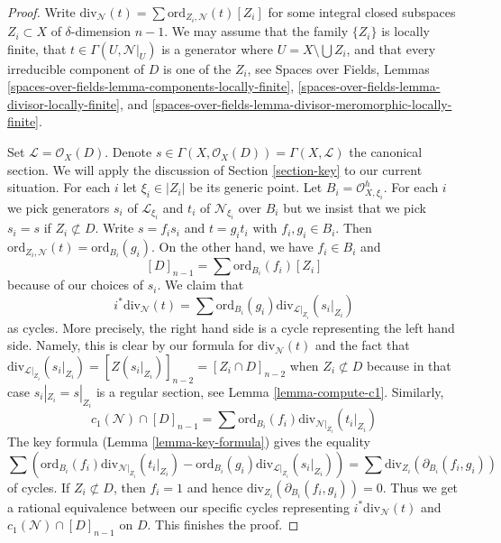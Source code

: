 \documentclass{stacks-project}
\theoremstyle{plain}
\theoremstyle{definition}
\theoremstyle{remark}
\numberwithin{equation}{subsection}
\begin{document}
\begin{proof}
Write $\text{div}_\mathcal{N}(t) = \sum \text{ord}_{Z_i, \mathcal{N}}(t)[Z_i]$
for some integral closed subspaces $Z_i \subset X$ of $\delta$-dimension
$n - 1$. We may assume that the family $\{Z_i\}$ is locally
finite, that $t \in \Gamma(U, \mathcal{N}|_U)$ is a generator
where $U = X \setminus \bigcup Z_i$, and that every irreducible component
of $D$ is one of the $Z_i$, see
Spaces over Fields, Lemmas
\ref{spaces-over-fields-lemma-components-locally-finite},
\ref{spaces-over-fields-lemma-divisor-locally-finite}, and
\ref{spaces-over-fields-lemma-divisor-meromorphic-locally-finite}.

\medskip\noindent
Set $\mathcal{L} = \mathcal{O}_X(D)$. Denote
$s \in \Gamma(X, \mathcal{O}_X(D)) = \Gamma(X, \mathcal{L})$
the canonical section. We will apply the discussion of
Section \ref{section-key} to our current situation.
For each $i$ let $\xi_i \in |Z_i|$ be its generic point. Let
$B_i = \mathcal{O}_{X, \xi_i}^h$. For each $i$ we pick generators
$s_i$ of $\mathcal{L}_{\xi_i}$ and $t_i$ of $\mathcal{N}_{\xi_i}$
over $B_i$ but we insist that we pick $s_i = s$ if $Z_i \not \subset D$.
Write $s = f_i s_i$ and $t = g_i t_i$ with $f_i, g_i \in B_i$.
Then $\text{ord}_{Z_i, \mathcal{N}}(t) = \text{ord}_{B_i}(g_i)$.
On the other hand, we have $f_i \in B_i$ and
$$
[D]_{n - 1} = \sum \text{ord}_{B_i}(f_i)[Z_i]
$$
because of our choices of $s_i$. We claim that
$$
i^*\text{div}_\mathcal{N}(t) =
\sum \text{ord}_{B_i}(g_i) \text{div}_{\mathcal{L}|_{Z_i}}(s_i|_{Z_i})
$$
as cycles. More precisely, the right hand side is a cycle
representing the left hand side. Namely, this is clear by our
formula for $\text{div}_\mathcal{N}(t)$ and the fact that
$\text{div}_{\mathcal{L}|_{Z_i}}(s_i|_{Z_i}) = [Z(s_i|_{Z_i})]_{n - 2} =
[Z_i \cap D]_{n - 2}$ when $Z_i \not \subset D$ because in
that case $s_i|_{Z_i} = s|_{Z_i}$ is a regular section, see
Lemma \ref{lemma-compute-c1}. Similarly,
$$
c_1(\mathcal{N}) \cap [D]_{n - 1} =
\sum \text{ord}_{B_i}(f_i) \text{div}_{\mathcal{N}|_{Z_i}}(t_i|_{Z_i})
$$
The key formula (Lemma \ref{lemma-key-formula}) gives the equality
$$
\sum \left(
\text{ord}_{B_i}(f_i) \text{div}_{\mathcal{N}|_{Z_i}}(t_i|_{Z_i}) -
\text{ord}_{B_i}(g_i) \text{div}_{\mathcal{L}|_{Z_i}}(s_i|_{Z_i}) \right) =
\sum \text{div}_{Z_i}(\partial_{B_i}(f_i, g_i))
$$
of cycles. If $Z_i \not \subset D$, then $f_i = 1$ and hence
$\text{div}_{Z_i}(\partial_{B_i}(f_i, g_i)) = 0$. Thus we get a rational
equivalence between our specific cycles representing
$i^*\text{div}_\mathcal{N}(t)$ and $c_1(\mathcal{N}) \cap [D]_{n - 1}$
on $D$. This finishes the proof.
\end{proof}
\end{document}
